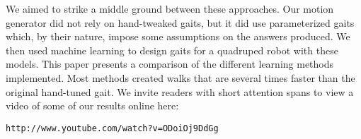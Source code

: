 We aimed to strike a middle ground between these approaches.  Our
motion generator did not rely on hand-tweaked gaits, but it did use
parameterized gaits which, by their nature, impose some assumptions on
the answers produced.  We then used machine learning to design gaits
for a quadruped robot with these models.  This paper presents a
comparison of the different learning methods implemented.  Most
methods created walks that are several times faster than the original
hand-tuned gait.  We invite readers with short attention spans to view
a video of some of our results online here:

\texttt{http://www.youtube.com/watch?v=ODoiOj9DdGg}

